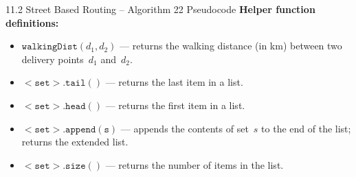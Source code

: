 \documentclass[aspectratio=169,10pt]{beamer}
\begin{document}
\begin{frame}[allowframebreaks]{11.2 Street Based Routing -- Algorithm 22 Pseudocode}
  \textbf{Helper function definitions:}
  \begin{itemize}
    \item $\mathtt{walkingDist}(d_1, d_2)$ --- returns the walking distance
          (in km) between two delivery points~$d_1$ and~$d_2$.
    \item $\mathtt{<set>.tail()}$ --- returns the last item in a list.
    \item $\mathtt{<set>.head()}$ --- returns the first item in a list.
    \item $\mathtt{<set>.append(s)}$ --- appends the contents of set~$s$
          to the end of the list; returns the extended list.
    \item $\mathtt{<set>.size()}$ --- returns the number of items in the list.
  \end{itemize}

\end{frame}
\end{document}
